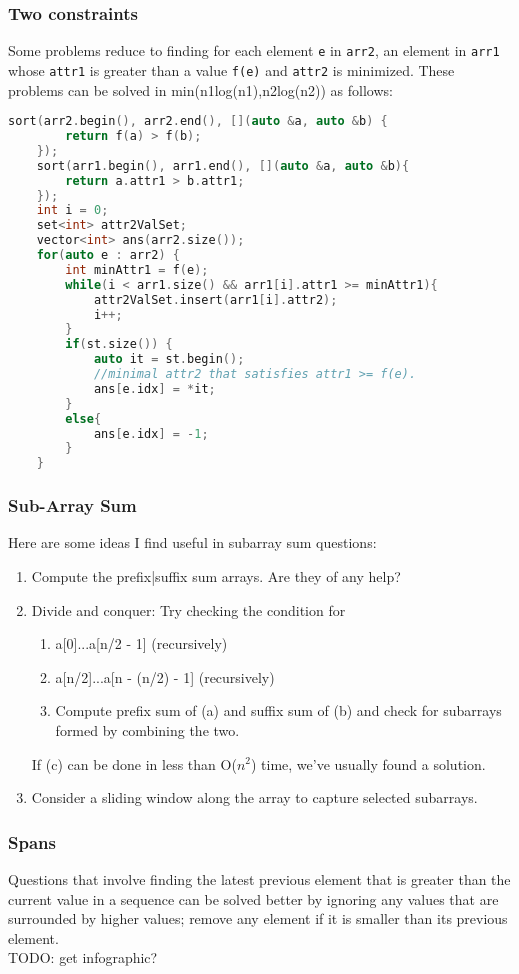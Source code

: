 \documentclass{article}
\begin{document}
\subsubsection{Two constraints}
Some problems reduce to finding for each element \texttt{e} in \texttt{arr2}, an 
element in \texttt{arr1} whose \texttt{attr1} is greater than a value \texttt{f(e)} 
and \texttt{attr2} is minimized. These problems can be solved in min(n1log(n1),n2log(n2)) as follows:
\begin{lstlisting}[caption=Two constraints, language=C++]
    sort(arr2.begin(), arr2.end(), [](auto &a, auto &b) {
        return f(a) > f(b);
    });
    sort(arr1.begin(), arr1.end(), [](auto &a, auto &b){
        return a.attr1 > b.attr1;
    });
    int i = 0;
    set<int> attr2ValSet;
    vector<int> ans(arr2.size());
    for(auto e : arr2) {
        int minAttr1 = f(e);
        while(i < arr1.size() && arr1[i].attr1 >= minAttr1){
            attr2ValSet.insert(arr1[i].attr2);
            i++;
        }
        if(st.size()) {
            auto it = st.begin();
            //minimal attr2 that satisfies attr1 >= f(e).
            ans[e.idx] = *it;
        }
        else{
            ans[e.idx] = -1;
        }
    }
\end{lstlisting}
\subsubsection{Sub-Array Sum}
Here are some ideas I find useful in subarray sum questions:
\begin{enumerate}
    \item Compute the prefix|suffix sum arrays. Are they of any help?
    \item Divide and conquer: Try checking the condition for
    \begin{enumerate}
        \item a[0]...a[n/2 - 1] (recursively)
        \item a[n/2]...a[n - (n/2) - 1] (recursively)
        \item Compute prefix sum of (a) and suffix sum of (b)
        and check for subarrays formed by combining the two.
    \end{enumerate}
    If (c) can be done in less than O($n^2$) time, we've usually found a solution.
    \item Consider a sliding window along the array to capture selected
    subarrays. 
\end{enumerate}
\subsubsection{Spans}
Questions that involve finding the latest previous element that is greater than the 
current value in a sequence can be solved better by ignoring any values that are
surrounded by higher values; remove any element if it is smaller than its previous
element.\\
TODO: get infographic?
\end{document}
